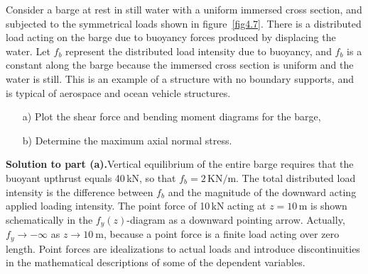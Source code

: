 \documentclass{AeroStructure-ERJohnson}
\begin{document}
\begin{example*}\label{ex4.2}\setcounter{equation}{0}\def\theequation{\alph{equation}}%
Consider a barge at rest in still water with a uniform immersed cross section, and subjected to the symmetrical loads shown in figure~\ref{fig4.7}. There is a distributed load acting on the barge due to buoyancy forces produced by displacing the water. Let $f_{b}$ represent the distributed load intensity due to buoyancy, and $f_{b}$ is a constant along\vadjust{\pagebreak} the barge because the immersed cross section is uniform and the water is still. This is an example of a structure with no boundary supports, and is typical of aerospace and ocean vehicle structures.

\begin{enumerate}[b)]
  \item[a)] Plot the shear force and bending moment diagrams for the barge,
  \item[b)] Determine the maximum axial normal stress.
\end{enumerate}

\noindent\textbf{Solution to part (a).}\enspace Vertical equilibrium of the entire barge requires that the buoyant upthrust equals 40\,kN, so that $f_{b}=2\,\mathrm{KN}/\mathrm{m}$. The total distributed load intensity is the difference between $f_{b}$ and the magnitude of the downward acting applied loading intensity. The point force of 10\,kN acting at $z = 10$\,m is shown schematically in the $f_{y}(z)$-diagram as a downward pointing arrow. Actually, $f_{y} \rightarrow-\infty$ as $z \rightarrow 10~\mathrm{m}$, because a point force is a finite load acting over zero length. Point forces are idealizations to actual loads and introduce discontinuities in the mathematical descriptions of some of the dependent variables.


\end{example*}
\end{document}

